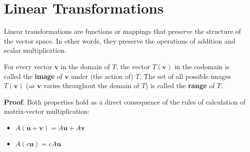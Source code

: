 \section{Linear Transformations}

Linear transformations are functions or mappings that preserve the structure of the vector space. In other words, they preserve the operations of addition and scalar multiplication.


For every vector $\mathbf{v}$ in the domain of $T$, the vector $T(\mathbf{v})$ in the codomain is called the \textbf{image} of $\mathbf{v}$ under (the action of) $T$. The set of all possible images $T(\mathbf{v})$ (as $\mathbf{v}$ varies throughout the domain of $T$) is called the \textbf{range} of $T$.


\textbf{Proof}: Both properties hold as a direct consequence of the rules of calculation of matrix-vector multiplication:
\begin{itemize}
    \item $A(\mathbf{u} + \mathbf{v}) = A \mathbf{u} + A \mathbf{v}$
    \item $A(c \mathbf{u}) = c A \mathbf{u}$
\end{itemize}

